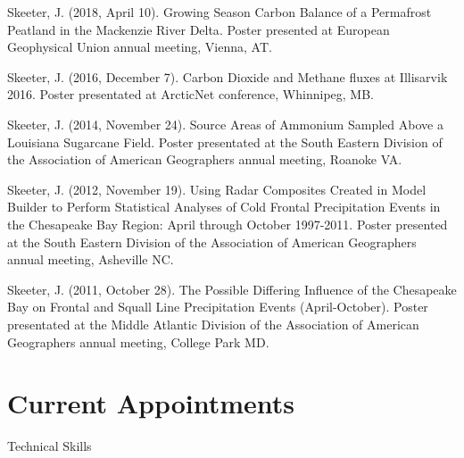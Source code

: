 \documentclass[
]{article}
\newlength{\cslhangindent}
\newlength{\cslentryspacingunit} %
\newenvironment{CSLReferences}[2] %
 {%
  \setlength{\parindent}{0pt}
  \ifodd #1
  \let\oldpar\par
  \def\par{\hangindent=\cslhangindent\oldpar}
  \fi
  \setlength{\parskip}{#2\cslentryspacingunit}
 }%
 {}
\begin{document}
\hypertarget{refs-4.3}{}
\begin{CSLReferences}{1}{0}
\leavevmode{}%
Skeeter, J. (2018, April 10). Growing {Season} {Carbon} {Balance} of a
{Permafrost} {Peatland} in the {Mackenzie} {River} {Delta}. Poster
presented at European Geophysical Union annual meeting, Vienna, AT.

\leavevmode{}%
Skeeter, J. (2016, December 7). Carbon {Dioxide} and {Methane} fluxes at
{Illisarvik} 2016. Poster presentated at ArcticNet conference,
Whinnipeg, MB.

\leavevmode{}%
Skeeter, J. (2014, November 24). Source {Areas} of {Ammonium} {Sampled}
{Above} a {Louisiana} {Sugarcane} {Field}. Poster presentated at the
South Eastern Division of the Association of American Geographers annual
meeting, Roanoke VA.

\leavevmode{}%
Skeeter, J. (2012, November 19). Using {Radar} {Composites} {Created} in
{Model} {Builder} to {Perform} {Statistical} {Analyses} of {Cold}
{Frontal} {Precipitation} {Events} in the {Chesapeake} {Bay} {Region}:
{April} through {October} 1997-2011. Poster presented at the South
Eastern Division of the Association of American Geographers annual
meeting, Asheville NC.

\leavevmode{}%
Skeeter, J. (2011, October 28). The {Possible} {Differing} {Influence}
of the {Chesapeake} {Bay} on {Frontal} and {Squall} {Line}
{Precipitation} {Events} ({April}-{October}). Poster presentated at the
Middle Atlantic Division of the Association of American Geographers
annual meeting, College Park MD.

\end{CSLReferences}

\hypertarget{current-appointments}{%
\section{Current Appointments}\label{current-appointments}}

Technical Skills
\end{document}
